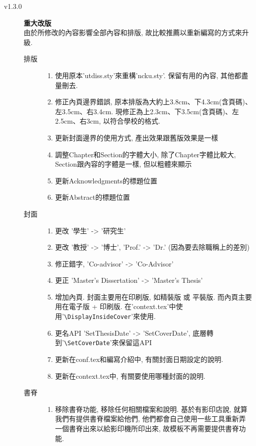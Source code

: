 \begin{description}
  \item[v1.3.0] \textbf{重大改版}\\
    由於所修改的內容影響全部內容和排版, 故比較推薦以重新編寫的方式來升級.\hfill
    \begin{description}
      \item[排版] \hfill
        \begin{enumerate}
          \item 使用原本'utdiss.sty'來重構'ncku.sty'. 保留有用的內容, 其他都盡量刪去.
          \item 修正內頁邊界錯誤, 原本排版為大約上3.8cm、下4.3cm(含頁碼)、左3.5cm、右3.4cm. 現修正為上2.3cm、下3.5cm(含頁碼)、左2.5cm、右3cm, 以符合學校的格式.
          \item 更新封面邊界的使用方式, 產出效果跟舊版效果是一樣
          \item 調整Chapter和Section的字體大小, 除了Chapter字體比較大, Section跟內容的字體是一樣, 但以粗體來顯示
          \item 更新Acknowledgments的標題位置
          \item 更新Abstract的標題位置
        \end{enumerate}
      \item[封面] \hfill
        \begin{enumerate}
          \item 更改 '學生' -> '研究生'
          \item 更改 '教授' -> '博士', 'Prof.' -> 'Dr.' (因為要去除職稱上的差別)
          \item 修正錯字, 'Co-advisor' -> 'Co-Advisor'
          \item 更正 'Master's Dissertation' -> 'Master's Thesis'
          \item 增加內頁. 封面主要用在印刷版, 如精裝版 或 平裝版. 而內頁主要用在電子版 + 印刷版. 在'context.tex'中使用'\verb|\DisplayInsideCover|'來使用.
          \item 更名API 'SetThesisDate' -> 'SetCoverDate', 底層轉到'\verb|\SetCoverDate|'來保留這API
          \item 更新在conf.tex和編寫介紹中, 有關封面日期設定的說明.
          \item 更新在context.tex中, 有關要使用哪種封面的說明.
        \end{enumerate}
      \item[書脊] \hfill
        \begin{enumerate}
          \item 移除書脊功能, 移除任何相關檔案和說明. 基於有影印店說, 就算我們有提供書脊檔案給他們, 他們都會自己使用一些工具重新弄一個書脊出來以給影印機所印出來, 故模板不再需要提供書脊功能.

\end{enumerate}
\end{description}
\end{description}
